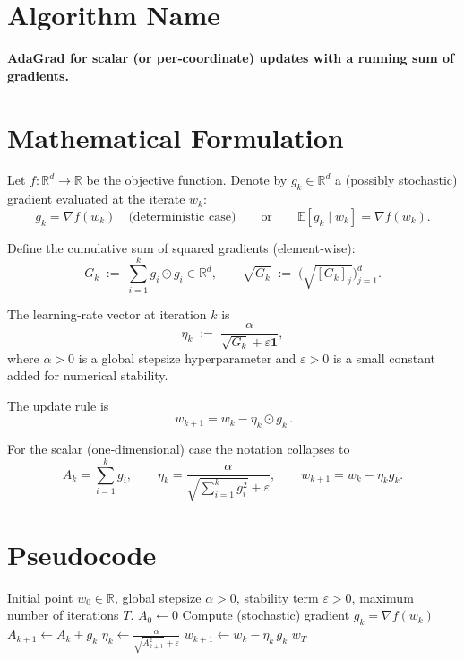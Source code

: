 \documentclass{article}
\begin{document}
\section*{Algorithm Name}
\textbf{AdaGrad for scalar (or per‑coordinate) updates with a running sum of gradients.}

\section*{Mathematical Formulation}
Let $f:\mathbb{R}^d\rightarrow\mathbb{R}$ be the objective function.
Denote by $g_k\in\mathbb{R}^d$ a (possibly stochastic) gradient evaluated at the iterate $w_k$:
\[
g_k = \nabla f(w_k) \quad\text{(deterministic case)}\qquad\text{or}\qquad 
\mathbb{E}[g_k\mid w_k]=\nabla f(w_k).
\]

Define the cumulative sum of squared gradients (element‑wise):
\[
G_k \;:=\; \sum_{i=1}^{k} g_i\odot g_i\in\mathbb{R}^d,\qquad 
\sqrt{G_k} \;:=\; \big(\sqrt{[G_k]_j}\big)_{j=1}^d .
\]

The learning‑rate vector at iteration $k$ is
\[
\eta_k \;:=\; \frac{\alpha}{\sqrt{G_k}+\varepsilon\mathbf 1},
\]
where $\alpha>0$ is a global stepsize hyperparameter and $\varepsilon>0$ is a small constant added for numerical stability.

The update rule is
\[
\boxed{\,w_{k+1}= w_k - \eta_k\odot g_k\,}.
\]

For the scalar (one‑dimensional) case the notation collapses to
\[
A_k = \sum_{i=1}^{k} g_i,\qquad 
\eta_k = \frac{\alpha}{\sqrt{\sum_{i=1}^{k} g_i^{2}}+\varepsilon},
\qquad 
w_{k+1}= w_k - \eta_k g_k .
\]

\section*{Pseudocode}
\begin{algorithm}[H]
\caption{Scalar AdaGrad (running sum of gradients)}\label{alg:adagrad}
\begin{algorithmic}[1]
\REQUIRE Initial point $w_0\in\mathbb{R}$, global stepsize $\alpha>0$, stability term $\varepsilon>0$,
        maximum number of iterations $T$.
\STATE $A_0 \leftarrow 0$ 
    \STATE Compute (stochastic) gradient $g_k = \nabla f(w_k)$
    \STATE $A_{k+1} \leftarrow A_k + g_k$ 
    \STATE $\eta_k \leftarrow \displaystyle\frac{\alpha}{\sqrt{A_{k+1}^{2}}+\varepsilon}$
    \STATE $w_{k+1} \leftarrow w_k - \eta_k\, g_k$
\ENDFOR
\RETURN $w_T$
\end{algorithmic}
\end{algorithm}
\end{document}
